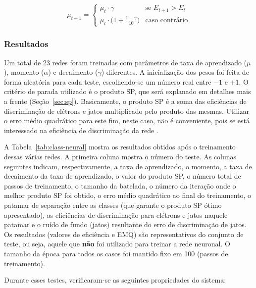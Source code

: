 \begin{equation}
\mu_{t+1} = 
\begin{cases}
\mu_{t}\cdot\gamma& \text{se } E_{t+1} > E_t \\
\mu_{t}\cdot\bigl(1+\frac{1-\gamma}{10}\bigr)& \text{caso contrário}
\end{cases}
\label{eq:decay}
\end{equation}

\subsubsection{Resultados}

Um total de 23 redes foram treinadas com parâmetros de taxa de aprendizado
($\mu$), momento ($\alpha$) e decaimento ($\gamma$) diferentes. A
inicialização dos pesos foi feita de forma aleatória para cada teste,
escolhendo-se um número real entre $-1$ e $+1$. O critério de parada utilizado
é o produto SP, que será explanado em detalhes mais a frente
(Seção~\ref{sec:sp}). Basicamente, o produto SP é a soma das eficiências de
discriminação de elétrons e jatos multiplicado pelo produto das
mesmas. Utilizar o erro médio quadrático para este fim, neste caso, não é
conveniente, pois se está interessado na eficiência de discriminação da rede
\cite{haykin}.

A Tabela~\ref{tab:class-neural} mostra os resultados obtidos após o
treinamento dessas várias redes. A primeira coluna mostra o número do
teste. As colunas seguintes indicam, respectivamente, a taxa de aprendizado, o
momento, a taxa de decaimento da taxa de aprendizado, o valor do produto SP, o
número total de passos de treinamento, o tamanho da batelada, o número da
iteração onde o melhor produto SP foi obtido, o erro médio quadrático ao final
do treinamento, o patamar de separação entre as classes (que garante o produto
SP ótimo apresentado), as eficiências de discriminação para elétrons e jatos
naquele patamar e o ruído de fundo (jatos) resultante do erro de discriminação
de jatos. Os resultados (valores de eficiência e EMQ) são representativos do
conjunto de teste, ou seja, aquele que \textbf{não} foi utilizado para treinar
a rede neuronal. O tamanho da época para todos os casos foi mantido fixo em
100 (passos de treinamento).

Durante esses testes, verificaram-se as seguintes propriedades do sistema:

